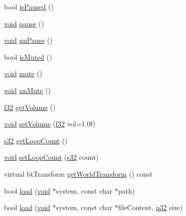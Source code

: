 \begin{DoxyCompactItemize}
\item 
bool \mbox{\hyperlink{classnjli_1_1_sound_a78cf20388060b6be413aadc5967193c4}{is\+Paused}} ()
\item 
\mbox{\hyperlink{_thread_8h_af1e856da2e658414cb2456cb6f7ebc66}{void}} \mbox{\hyperlink{classnjli_1_1_sound_ac9b262c7c7d7a68f3812e0d30b675648}{pause}} ()
\item 
\mbox{\hyperlink{_thread_8h_af1e856da2e658414cb2456cb6f7ebc66}{void}} \mbox{\hyperlink{classnjli_1_1_sound_ab6f878ee1163bab97ffffc98ee60789d}{un\+Pause}} ()
\item 
bool \mbox{\hyperlink{classnjli_1_1_sound_a75777bf34afc2d2c3a83238dbc67aae3}{is\+Muted}} ()
\item 
\mbox{\hyperlink{_thread_8h_af1e856da2e658414cb2456cb6f7ebc66}{void}} \mbox{\hyperlink{classnjli_1_1_sound_adf46d412ea87b44a16190049b74a18ff}{mute}} ()
\item 
\mbox{\hyperlink{_thread_8h_af1e856da2e658414cb2456cb6f7ebc66}{void}} \mbox{\hyperlink{classnjli_1_1_sound_aec8eb5528c8c0f4abfd7a69b0fb48aff}{un\+Mute}} ()
\item 
\mbox{\hyperlink{_util_8h_a5f6906312a689f27d70e9d086649d3fd}{f32}} \mbox{\hyperlink{classnjli_1_1_sound_ab765af304f9023b6aa75cea03893fa32}{get\+Volume}} ()
\item 
\mbox{\hyperlink{_thread_8h_af1e856da2e658414cb2456cb6f7ebc66}{void}} \mbox{\hyperlink{classnjli_1_1_sound_a2dd1ddc8d8b04c90bb06808ad43e6642}{set\+Volume}} (\mbox{\hyperlink{_util_8h_a5f6906312a689f27d70e9d086649d3fd}{f32}} vol=1.\+0f)
\item 
\mbox{\hyperlink{_util_8h_aa62c75d314a0d1f37f79c4b73b2292e2}{s32}} \mbox{\hyperlink{classnjli_1_1_sound_a200bee960269b65caf5e756db795cc31}{get\+Loop\+Count}} ()
\item 
\mbox{\hyperlink{_thread_8h_af1e856da2e658414cb2456cb6f7ebc66}{void}} \mbox{\hyperlink{classnjli_1_1_sound_a0b08a237f722aec6daa46c364026834d}{set\+Loop\+Count}} (\mbox{\hyperlink{_util_8h_aa62c75d314a0d1f37f79c4b73b2292e2}{s32}} count)
\item 
virtual bt\+Transform \mbox{\hyperlink{classnjli_1_1_sound_ac6e54aa0ca0c4e9893d9a78322f86dd3}{get\+World\+Transform}} () const
\item 
bool \mbox{\hyperlink{classnjli_1_1_sound_a56f596a7daacc96a7f6127dc75d12866}{load}} (\mbox{\hyperlink{_thread_8h_af1e856da2e658414cb2456cb6f7ebc66}{void}} $\ast$system, const char $\ast$path)
\item 
bool \mbox{\hyperlink{classnjli_1_1_sound_ae1637016ca27ecf2259b5428ae3a5f41}{load}} (\mbox{\hyperlink{_thread_8h_af1e856da2e658414cb2456cb6f7ebc66}{void}} $\ast$system, const char $\ast$file\+Content, \mbox{\hyperlink{_util_8h_a10e94b422ef0c20dcdec20d31a1f5049}{u32}} size)

\end{DoxyCompactItemize}
